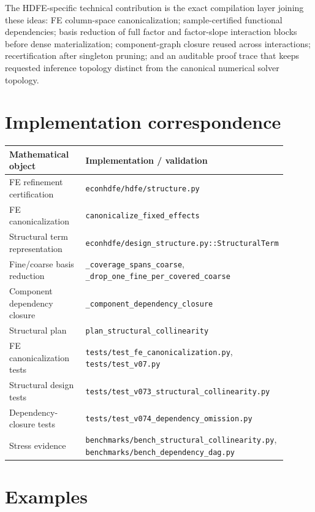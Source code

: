\documentclass[11pt]{article}
\theoremstyle{definition}
\newcommand{\1}{\mathbf{1}}
\begin{document}
The HDFE-specific technical contribution is the exact compilation layer joining these ideas: FE column-space canonicalization; sample-certified functional dependencies; basis reduction of full factor and factor-slope interaction blocks before dense materialization; component-graph closure reused across interactions; recertification after singleton pruning; and an auditable proof trace that keeps requested inference topology distinct from the canonical numerical solver topology.

\section{Implementation correspondence}

\begin{center}
\begin{tabular}{p{0.34\linewidth}p{0.56\linewidth}}
\toprule
Mathematical object & Implementation / validation \\
\midrule
FE refinement certification & \texttt{econhdfe/hdfe/structure.py} \\
FE canonicalization & \texttt{canonicalize\_fixed\_effects} \\
Structural term representation & \texttt{econhdfe/design\_structure.py::StructuralTerm} \\
Fine/coarse basis reduction & \texttt{\_coverage\_spans\_coarse}, \texttt{\_drop\_one\_fine\_per\_covered\_coarse} \\
Component dependency closure & \texttt{\_component\_dependency\_closure} \\
Structural plan & \texttt{plan\_structural\_collinearity} \\
FE canonicalization tests & \texttt{tests/test\_fe\_canonicalization.py}, \texttt{tests/test\_v07.py} \\
Structural design tests & \texttt{tests/test\_v073\_structural\_collinearity.py} \\
Dependency-closure tests & \texttt{tests/test\_v074\_dependency\_omission.py} \\
Stress evidence & \texttt{benchmarks/bench\_structural\_collinearity.py}, \texttt{benchmarks/bench\_dependency\_dag.py} \\
\bottomrule
\end{tabular}
\end{center}

\section{Examples}
\end{document}
